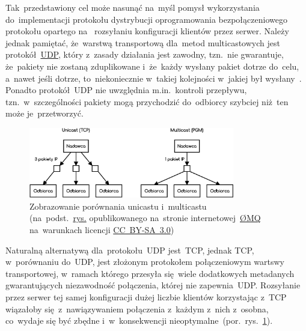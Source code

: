\documentclass[thesis]{subfiles}
\begin{document}
Tak~przedstawiony cel może nasunąć na~myśl pomysł wykorzystania do~implementacji protokołu dystrybucji oprogramowania bezpołączeniowego protokołu opartego na~ rozsyłaniu konfiguracji klientów przez serwer. Należy jednak pamiętać, że~warstwą transportową dla~metod multicastowych jest protokół~\href{https://en.wikipedia.org/wiki/User_Datagram_Protocol}{UDP}, który z~zasady działania jest zawodny, tzn.~nie gwarantuje, że~pakiety nie zostaną zduplikowane i~że~każdy wysłany pakiet dotrze do~celu, a~nawet jeśli dotrze, to~niekoniecznie w~takiej kolejności w~jakiej był wysłany~\cite{rfc1112}. Ponadto protokół~UDP nie uwzględnia m.in.~kontroli przepływu, tzn.~w~szczególności pakiety mogą przychodzić do~odbiorcy szybciej niż~ten może je~przetworzyć.

\begin{figure}
	\centering
	\includegraphics[width=0.8\textwidth]{img/unicast-vs-multicast}
	\caption{Zobrazowanie porównania unicastu i~multicastu\\(na~podst.~\href{http://zeromq.wdfiles.com/local--files/whitepapers\%3Adesign-v05/pgm2.png}{rys.} opublikowanego na~stronie internetowej~\href{http://zeromq.org/}{ØMQ} na~warunkach licencji  \href{https://creativecommons.org/licenses/by-sa/3.0/}{CC~BY-SA~3.0})}
	\label{fig:unicast-vs-multicast}
\end{figure}

Naturalną alternatywą dla~protokołu~UDP jest~TCP, jednak TCP, w~porównaniu do~UDP, jest złożonym protokołem połączeniowym wartswy transportowej, w~ramach którego przesyła się~wiele dodatkowych metadanych gwarantujących niezawodność połączenia, której nie zapewnia~UDP. Rozsyłanie przez serwer tej samej konfiguracji dużej liczbie klientów korzystając z~TCP wiązałoby się~z~nawiązywaniem połączenia z~każdym z~nich z~osobna, co~wydaje się być zbędne i~w~konsekwencji nieoptymalne~(por.~rys.~\ref{fig:unicast-vs-multicast}).
\end{document}

